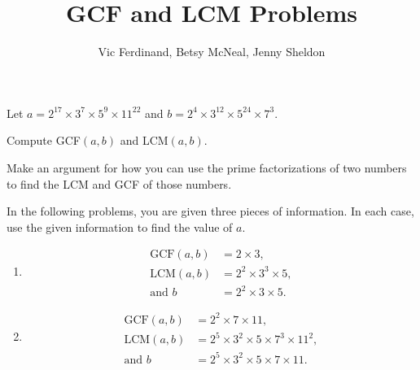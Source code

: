 \documentclass[nooutcomes,nooutcomes,handout]{ximera}
\title{GCF and LCM Problems}
\author{Vic Ferdinand, Betsy McNeal, Jenny Sheldon}
\begin{document}
\begin{abstract} \end{abstract}
\maketitle




\begin{problem} 

Let
$a = 2^{17}\times 3^7 \times 5^9 \times 11^{22}$ and $b =  2^{4}\times 3^{12} \times 5^{24} \times 7^{3}$.

Compute GCF$(a,b)$ and LCM$(a,b)$.

\end{problem}

\begin{problem}
Make an argument for how you can use the prime factorizations of two
numbers to find the LCM and GCF of those numbers.
\end{problem}
\vfill
\newpage

\begin{problem}
In the following problems, you are given three pieces of
information. In each case, use the given information to find the value
of $a$.

\begin{enumerate}
\item 
\begin{align*}
  \text{GCF}(a,b) &= 2 \times 3,\\ \text{LCM}(a,b) &= 2^2 \times
  3^3 \times 5,\\ \text{and } b &= 2^2 \times 3 \times 5.
\end{align*}

\vfill
\item  
\begin{align*}
  \text{GCF}(a,b) &= 2^2 \times 7 \times 11,\\
  \text{LCM}(a,b) &= 2^5 \times 3^2 \times 5 \times 7^3 \times 11^2,\\
  \text{and }   b &= 2^5 \times 3^2 \times 5 \times 7 \times 11.
\end{align*}
\vfill
\end{enumerate}
\end{problem}

\newpage
\end{document}
